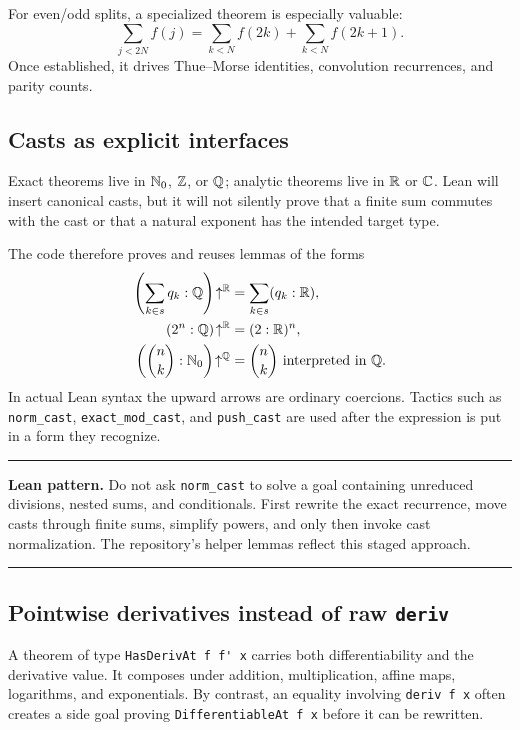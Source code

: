\documentclass[11pt,oneside]{article}
\theoremstyle{definition}
\theoremstyle{remark}
\newenvironment{boxedremark}{%
  \par\smallskip\noindent\begin{center}\begin{minipage}{0.94\textwidth}%
  \color{black}\hrule\vspace{0.6em}\small
}{%
  \vspace{0.6em}\hrule\end{minipage}\end{center}\smallskip
}
\begin{document}
For even/odd splits, a specialized theorem is especially valuable:
\[
  \sum_{j<2N}f(j)
  =\sum_{k<N}f(2k)+\sum_{k<N}f(2k+1).
\]
Once established, it drives Thue--Morse identities, convolution recurrences, and parity counts.

\subsection{Casts as explicit interfaces}
Exact theorems live in \(\mathbb{N}_{0}\), \(\mathbb{Z}\), or \(\mathbb{Q}\); analytic theorems live in \(\mathbb{R}\) or \(\mathbb{C}\).  Lean will insert canonical casts, but it will not silently prove that a finite sum commutes with the cast or that a natural exponent has the intended target type.

The code therefore proves and reuses lemmas of the forms
\begin{align*}
  \left(\sum_{k\in s}q_k:\mathbb{Q}\right)\!\uparrow^{\mathbb{R}}
    &=\sum_{k\in s}(q_k:\mathbb{R}),\\
  (2^n:\mathbb{Q})\!\uparrow^{\mathbb{R}}&=(2:\mathbb{R})^n,\\
  \left(\binom nk:\mathbb{N}_{0}\right)\!\uparrow^{\mathbb{Q}}
    &=\binom nk \text{ interpreted in }\mathbb{Q}.
\end{align*}
In actual Lean syntax the upward arrows are ordinary coercions.  Tactics such as \nolinkurl{norm_cast}, \nolinkurl{exact_mod_cast}, and \nolinkurl{push_cast} are used after the expression is put in a form they recognize.

\begin{boxedremark}\textbf{Lean pattern.}\space
Do not ask \nolinkurl{norm_cast} to solve a goal containing unreduced divisions, nested sums, and conditionals.  First rewrite the exact recurrence, move casts through finite sums, simplify powers, and only then invoke cast normalization.  The repository's helper lemmas reflect this staged approach.
\end{boxedremark}

\subsection{Pointwise derivatives instead of raw \texttt{deriv}}
A theorem of type \nolinkurl{HasDerivAt f f' x} carries both differentiability and the derivative value.  It composes under addition, multiplication, affine maps, logarithms, and exponentials.  By contrast, an equality involving \nolinkurl{deriv f x} often creates a side goal proving \nolinkurl{DifferentiableAt f x} before it can be rewritten.
\end{document}
